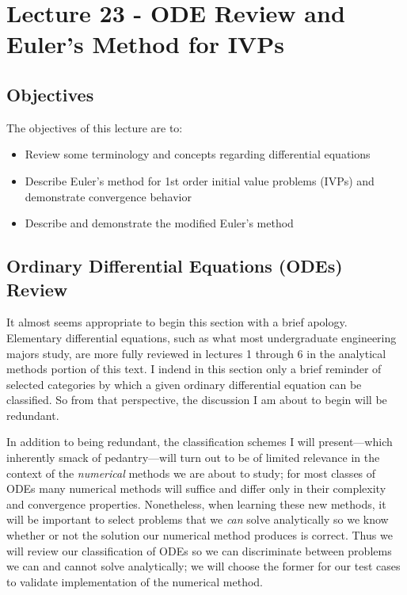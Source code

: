 \chapter{Lecture 23 - ODE Review and Euler's Method for IVPs}
\label{ch:lec23n}
\section{Objectives}
The objectives of this lecture are to:
\begin{itemize}
\item Review some terminology and concepts regarding differential equations
\item Describe Euler's method for 1st order initial value problems (IVPs) and demonstrate convergence behavior
\item Describe and demonstrate the modified Euler's method
\end{itemize}
\setcounter{lstannotation}{0}

\section{Ordinary Differential Equations (ODEs) Review}

It almost seems appropriate to begin this section with a brief apology.  Elementary differential equations, such as what most undergraduate engineering majors study, are more fully reviewed in lectures 1 through 6 in the analytical methods portion of this text.  I indend in this section only a brief reminder of selected categories by which a given ordinary differential equation can be classified.  So from that perspective, the discussion I am about to begin will be redundant.

In addition to being redundant, the classification schemes I will present---which inherently smack of pedantry---will turn out to be of limited relevance in the context of the \emph{numerical} methods we are about to study; for most classes of ODEs many numerical methods will suffice and differ only in their complexity and convergence properties.  Nonetheless, when learning these new methods, it will be important to select problems that we \emph{can} solve analytically so we know whether or not the solution our numerical method produces is correct.  Thus we will review our classification of ODEs so we can discriminate between problems we can and cannot solve analytically; we will choose the former for our test cases to validate implementation of the numerical method.


